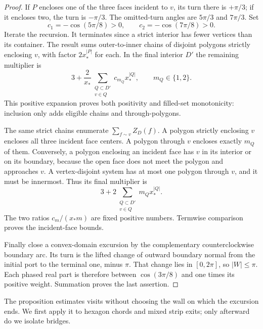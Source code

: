 \begin{proof}
If $P$ encloses one of the three faces incident to $v$, its turn there
is $+\pi/3$; if it encloses two, the turn is $-\pi/3$. The omitted-turn
angles are $5\pi/3$ and $7\pi/3$. Set
\[
 c_1=-\cos(5\pi/8)>0,\qquad c_2=-\cos(7\pi/8)>0.
\]
Iterate the recursion. It terminates since a strict interior has fewer
vertices than its container. The result sums outer-to-inner chains
of disjoint polygons strictly enclosing $v$, with factor $2x_*^{|P|}$
for each. In the final interior $D'$ the remaining multiplier is
\[
 3+\frac2{x_*}\sum_{\substack{Q\subset D'\\v\in Q}}
 c_{m_Q}x_*^{|Q|},\qquad m_Q\in\{1,2\}.
\]
This positive expansion proves both positivity and filled-set
monotonicity: inclusion only adds eligible chains and through-polygons.

The same strict chains enumerate $\sum_{f\sim v}Z_D(f)$. A polygon
strictly enclosing $v$ encloses all three incident face centers. A
polygon through $v$ encloses exactly $m_Q$ of them. Conversely, a
polygon enclosing an incident face has $v$ in its interior or on its
boundary, because the open face does not meet the polygon and
approaches $v$. A vertex-disjoint system has at most one polygon
through $v$, and it must be innermost. Thus its final multiplier is
\[
 3+2\sum_{\substack{Q\subset D'\\v\in Q}}m_Qx_*^{|Q|}.
\]
The two ratios $c_m/(x_*m)$ are fixed positive numbers. Termwise
comparison proves the incident-face bounds.

Finally close a convex-domain excursion by the complementary
counterclockwise boundary arc. Its turn is the lifted change of
outward boundary normal from the initial port to the terminal one,
minus $\pi$. That change lies in $[0,2\pi]$, so $|W|\le\pi$.
Each phased real part is therefore between $\cos(3\pi/8)$ and one
times its positive weight. Summation proves the last assertion.
\end{proof}

The proposition estimates visits without choosing the wall on which
the excursion ends. We first apply it to hexagon chords and mixed
strip exits; only afterward do we isolate bridges.

